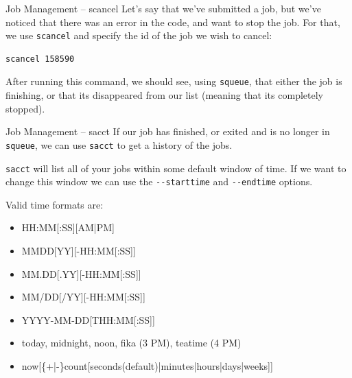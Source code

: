 \documentclass[10pt]{beamer}
\begin{document}
\begin{frame}[label={sec:org021b0bc},fragile]{Job Management -- scancel}
 Let's say that we've submitted a job, but we've noticed that there was an error
in the code, and want to stop the job. For that, we use \texttt{scancel} and specify the
id of the job we wish to cancel:

\begin{verbatim}
scancel 158590
\end{verbatim}

After running this command, we should see, using \texttt{squeue}, that either the job is
finishing, or that its disappeared from our list (meaning that its completely
stopped).
\end{frame}

\begin{frame}[label={sec:org84b7c06},fragile]{Job Management -- sacct}
 If our job has finished, or exited and is no longer in \texttt{squeue}, we can use \texttt{sacct}
to get a history of the jobs.

\texttt{sacct} will list all of your jobs within some default window of time. If we want
to change this window we can use the \texttt{-{}-starttime} and \texttt{-{}-endtime} options.

Valid time formats are:
\begin{itemize}
\item HH:MM[:SS][AM|PM]
\item MMDD[YY][-HH:MM[:SS]]
\item MM.DD[.YY][-HH:MM[:SS]]
\item MM/DD[/YY][-HH:MM[:SS]]
\item YYYY-MM-DD[THH:MM[:SS]]
\item today, midnight, noon, fika (3 PM), teatime (4 PM)
\item now[\{+|-\}count[seconds(default)|minutes|hours|days|weeks]]
\end{itemize}
\end{frame}
\end{document}

